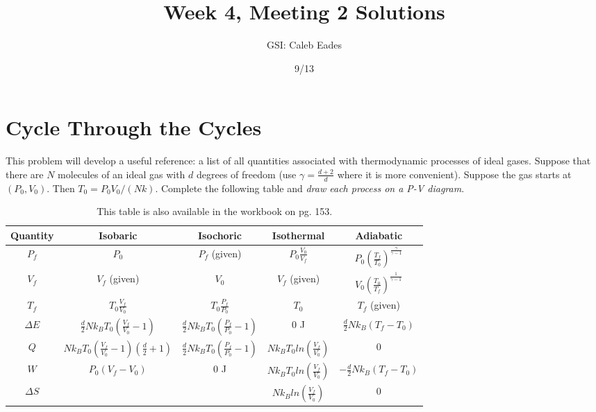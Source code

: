 \documentclass{article}
\begin{document}
\title{Week 4, Meeting 2 Solutions}
\author{GSI: Caleb Eades}
\date{9/13}
\maketitle

\section{Cycle Through the Cycles}

This problem will develop a useful reference: a list of all quantities associated with thermodynamic processes of ideal gases. Suppose that there are $N$ molecules of an ideal gas with $d$ degrees of freedom (use $\gamma = \frac{d+2}{d}$ where it is more convenient). Suppose the gas starts at $(P_0,V_0)$. Then $T_0 = P_0V_0/(Nk)$. Complete the following table and \textit{draw each process on a P-V diagram}.

\def\arraystretch{2.5}
\begin{table}[h]
	\begin{center}
	\caption{This table is also available in the workbook on pg. 153.}
	
	\begin{tabular}{| >{\Large}c|c|c|c|c|}
		\hline
		\normalsize{\textbf{Quantity}} & \textbf{Isobaric} & \textbf{Isochoric} & \textbf{Isothermal} & \textbf{Adiabatic} \\ \hline
		$P_f$             & $P_0$             & $P_f$ (given)          & $P_0\frac{V_0}{V_f}$& $P_0\left(\frac{T_f}{T_0}\right)^{\frac{\gamma}{\gamma-1}}$                   \\ \hline
		$V_f$             & $V_f$ (given)     & $V_0$                  & $V_f$ (given)       & $V_0\left(\frac{T_0}{T_f}\right)^{\frac{1}{\gamma-1}}$                   \\ \hline
		$T_f$             & $T_0\frac{V_f}{V_0}$& $T_0\frac{P_f}{P_0}$ & $T_0$               & $T_f$ (given)      \\ \hline
		$\Delta E$        & $\frac{d}{2}Nk_BT_0\left(\frac{V_f}{V_0}-1\right)$ & $\frac{d}{2}Nk_BT_0\left(\frac{P_f}{P_0}-1\right)$                       & $0$ J                 & $\frac{d}{2}Nk_B(T_f-T_0)$                   \\ \hline
		$Q$               & $Nk_BT_0\left(\frac{V_f}{V_0}-1\right)\left(\frac{d}{2}+1\right)$                  & $\frac{d}{2}Nk_BT_0\left(\frac{P_f}{P_0}-1\right)$                       & $Nk_BT_0ln\left(\frac{V_f}{V_0}\right)$                    & $0$                   \\ \hline
		$W$               & $P_0(V_f-V_0)$                  & $0$ J                      & $Nk_BT_0ln\left(\frac{V_f}{V_0}\right)$                    & $-\frac{d}{2}Nk_B(T_f-T_0)$                   \\ \hline
		$\Delta S$        &                   &                        & $Nk_Bln\left(\frac{V_f}{V_0}\right)$                    & $0$                    \\ \hline
	\end{tabular}
	\end{center}
\end{table}
\end{document}
